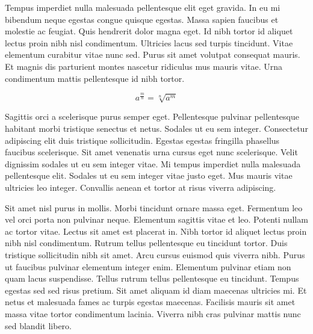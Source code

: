 \documentclass{article}
\begin{document}
    Tempus imperdiet nulla malesuada pellentesque elit eget gravida. In eu mi bibendum neque egestas congue quisque egestas. Massa sapien faucibus et molestie ac feugiat. Quis hendrerit dolor magna eget. Id nibh tortor id aliquet lectus proin nibh nisl condimentum. Ultricies lacus sed turpis tincidunt. Vitae elementum curabitur vitae nunc sed. Purus sit amet volutpat consequat mauris. Et magnis dis parturient montes nascetur ridiculus mus mauris vitae. Urna condimentum mattis pellentesque id nibh tortor.
    
    \begin{equation}
    	a^{\frac{m}{n}}=\sqrt[n]{a^{m}}
    \end{equation}
    
    Sagittis orci a scelerisque purus semper eget. Pellentesque pulvinar pellentesque habitant morbi tristique senectus et netus. Sodales ut eu sem integer. Consectetur adipiscing elit duis tristique sollicitudin. Egestas egestas fringilla phasellus faucibus scelerisque. Sit amet venenatis urna cursus eget nunc scelerisque. Velit dignissim sodales ut eu sem integer vitae. Mi tempus imperdiet nulla malesuada pellentesque elit. Sodales ut eu sem integer vitae justo eget. Mus mauris vitae ultricies leo integer. Convallis aenean et tortor at risus viverra adipiscing.
    
    Sit amet nisl purus in mollis. Morbi tincidunt ornare massa eget. Fermentum leo vel orci porta non pulvinar neque. Elementum sagittis vitae et leo. Potenti nullam ac tortor vitae. Lectus sit amet est placerat in. Nibh tortor id aliquet lectus proin nibh nisl condimentum. Rutrum tellus pellentesque eu tincidunt tortor. Duis tristique sollicitudin nibh sit amet. Arcu cursus euismod quis viverra nibh. Purus ut faucibus pulvinar elementum integer enim. Elementum pulvinar etiam non quam lacus suspendisse. Tellus rutrum tellus pellentesque eu tincidunt. Tempus egestas sed sed risus pretium. Sit amet aliquam id diam maecenas ultricies mi. Et netus et malesuada fames ac turpis egestas maecenas. Facilisis mauris sit amet massa vitae tortor condimentum lacinia. Viverra nibh cras pulvinar mattis nunc sed blandit libero.
    
\end{document}
